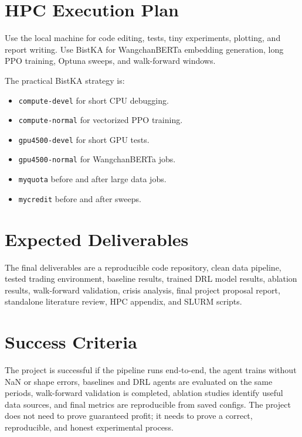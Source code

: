\documentclass[11pt]{article}
\begin{document}
\section{HPC Execution Plan}
Use the local machine for code editing, tests, tiny experiments, plotting, and report writing. Use BistKA for WangchanBERTa embedding generation, long PPO training, Optuna sweeps, and walk-forward windows.

The practical BistKA strategy is:
\begin{itemize}
\item \texttt{compute-devel} for short CPU debugging.
\item \texttt{compute-normal} for vectorized PPO training.
\item \texttt{gpu4500-devel} for short GPU tests.
\item \texttt{gpu4500-normal} for WangchanBERTa jobs.
\item \texttt{myquota} before and after large data jobs.
\item \texttt{mycredit} before and after sweeps.
\end{itemize}

\section{Expected Deliverables}
The final deliverables are a reproducible code repository, clean data pipeline, tested trading environment, baseline results, trained DRL model results, ablation results, walk-forward validation, crisis analysis, final project proposal report, standalone literature review, HPC appendix, and SLURM scripts.

\section{Success Criteria}
The project is successful if the pipeline runs end-to-end, the agent trains without NaN or shape errors, baselines and DRL agents are evaluated on the same periods, walk-forward validation is completed, ablation studies identify useful data sources, and final metrics are reproducible from saved configs. The project does not need to prove guaranteed profit; it needs to prove a correct, reproducible, and honest experimental process.
\end{document}

